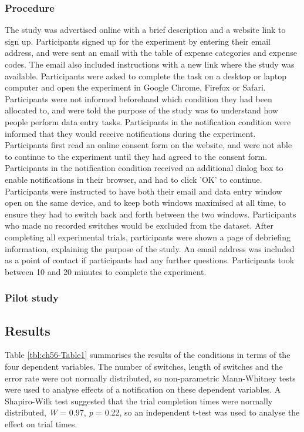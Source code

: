 \subsubsection{Procedure}
The study was advertised online with a brief description and a website link to sign up. Participants signed up for the experiment by entering their email address, and were sent an email with the table of expense categories and expense codes. The email also included instructions with a new link where the study was available. Participants were asked to complete the task on a desktop or laptop computer and open the experiment in Google Chrome, Firefox or Safari. Participants were not informed beforehand which condition they had been allocated to, and were told the purpose of the study was to understand how people perform data entry tasks. Participants in the notification condition were informed that they would receive notifications during the experiment. 
Participants first read an online consent form on the website, and were not able to continue to the experiment until they had agreed to the consent form. Participants in the notification condition received an additional dialog box to enable notifications in their browser, and had to click 'OK' to continue. Participants were instructed to have both their email and data entry window open on the same device, and to keep both windows maximised at all time, to ensure they had to switch back and forth between the two windows. Participants who made no recorded switches would be excluded from the dataset. 
After completing all experimental trials, participants were shown a page of debriefing information, explaining the purpose of the study. An email address was included as a point of contact if participants had any further questions. Participants took between 10 and 20 minutes to complete the experiment.

\subsubsection{Pilot study}

\subsection{Results}
Table \ref{tbl:ch56-Table1} summarises the results of the conditions in terms of the four dependent variables. The number of switches, length of switches and the error rate were not normally distributed, so non-parametric Mann-Whitney tests were used to analyse effects of a notification on these dependent variables. A Shapiro-Wilk test suggested that the trial completion times were normally distributed, \textit{W} = 0.97, \textit{p} = 0.22, so an independent t-test was used to analyse the effect on trial times. 

